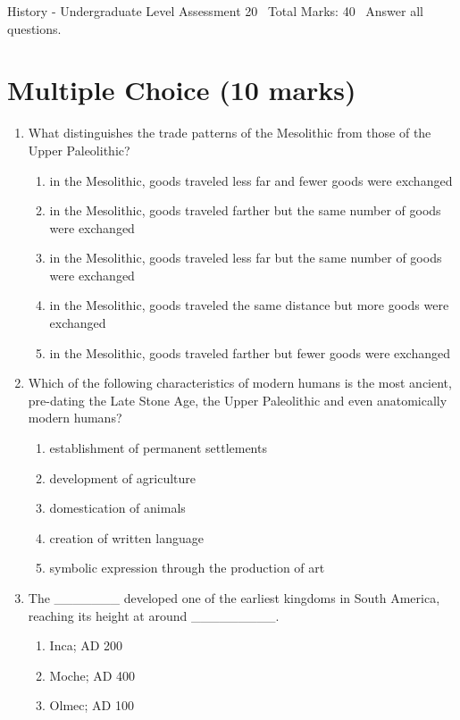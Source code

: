 \documentclass[12pt]{article}
\begin{document}
\begin{center}
History - Undergraduate Level Assessment 20 \
Total Marks: 40 \
Answer all questions.
\end{center}

\section*{Multiple Choice (10 marks)}
\begin{enumerate}[label=\arabic*.]
\item What distinguishes the trade patterns of the Mesolithic from those of the Upper Paleolithic?
\begin{enumerate}[label=(\alph*)]
    \item in the Mesolithic, goods traveled less far and fewer goods were exchanged
    \item in the Mesolithic, goods traveled farther but the same number of goods were exchanged
    \item in the Mesolithic, goods traveled less far but the same number of goods were exchanged
    \item in the Mesolithic, goods traveled the same distance but more goods were exchanged
    \item in the Mesolithic, goods traveled farther but fewer goods were exchanged
\end{enumerate}
\item Which of the following characteristics of modern humans is the most ancient, pre-dating the Late Stone Age, the Upper Paleolithic and even anatomically modern humans?
\begin{enumerate}[label=(\alph*)]
    \item establishment of permanent settlements
    \item development of agriculture
    \item domestication of animals
    \item creation of written language
    \item symbolic expression through the production of art
\end{enumerate}
\item The \_\_\_\_\_\_\_ developed one of the earliest kingdoms in South America, reaching its height at around \_\_\_\_\_\_\_\_\_.
\begin{enumerate}[label=(\alph*)]
    \item Inca; AD 200
    \item Moche; AD 400
    \item Olmec; AD 100

\end{enumerate}
\end{enumerate}
\end{document}
